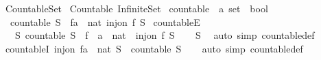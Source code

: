 %
\begin{isabellebody}%
%
%
\isadelimdocument
%
\endisadelimdocument
%
\isatagdocument
%
\isamarkuptrue%
%
\endisatagdocument
{\isafolddocument}%
%
\isadelimdocument
%
\endisadelimdocument
%
\isadelimtheory
%
\endisadelimtheory
%
\isatagtheory
{}\isamarkupfalse%
\ Countable{\isacharunderscore}Set\isanewline
{}\ Countable\ Infinite{\isacharunderscore}Set\isanewline
{}%
\endisatagtheory
{\isafoldtheory}%
%
\isadelimtheory
%
\endisadelimtheory
%
\isadelimdocument
%
\endisadelimdocument
%
\isatagdocument
%
\isamarkuptrue%
%
\endisatagdocument
{\isafolddocument}%
%
\isadelimdocument
%
\endisadelimdocument
{}\isamarkupfalse%
\ countable\ {\isacharcolon}{\isacharcolon}\ {\isachardoublequoteopen}{\isacharprime}a\ set\ {\isasymRightarrow}\ bool{\isachardoublequoteclose}\ \isanewline
\ \ {\isachardoublequoteopen}countable\ S\ {\isasymlongleftrightarrow}\ {\isacharparenleft}{\isasymexists}f{\isacharcolon}{\isacharcolon}{\isacharprime}a\ {\isasymRightarrow}\ nat{\isachardot}\ inj{\isacharunderscore}on\ f\ S{\isacharparenright}{\isachardoublequoteclose}\isanewline
\isanewline
{}\isamarkupfalse%
\ countableE{\isacharcolon}\isanewline
\ \ \ S{\isacharcolon}\ {\isachardoublequoteopen}countable\ S{\isachardoublequoteclose}\ \ f\ {\isacharcolon}{\isacharcolon}\ {\isachardoublequoteopen}{\isacharprime}a\ {\isasymRightarrow}\ nat{\isachardoublequoteclose}\ \ {\isachardoublequoteopen}inj{\isacharunderscore}on\ f\ S{\isachardoublequoteclose}\isanewline
%
\isadelimproof
\ \ %
\endisadelimproof
%
\isatagproof
{}\isamarkupfalse%
\ S\ \isamarkupfalse%
\ {\isacharparenleft}auto\ simp{\isacharcolon}\ countable{\isacharunderscore}def{\isacharparenright}%
\endisatagproof
{\isafoldproof}%
%
\isadelimproof
\isanewline
%
\endisadelimproof
\isanewline
{}\isamarkupfalse%
\ countableI{\isacharcolon}\ {\isachardoublequoteopen}inj{\isacharunderscore}on\ {\isacharparenleft}f{\isacharcolon}{\isacharcolon}{\isacharprime}a\ {\isasymRightarrow}\ nat{\isacharparenright}\ S\ {\isasymLongrightarrow}\ countable\ S{\isachardoublequoteclose}\isanewline
%
\isadelimproof
\ \ %
\endisadelimproof
%
\isatagproof
{}\isamarkupfalse%
\ {\isacharparenleft}auto\ simp{\isacharcolon}\ countable{\isacharunderscore}def{\isacharparenright}%

\end{isabellebody}
